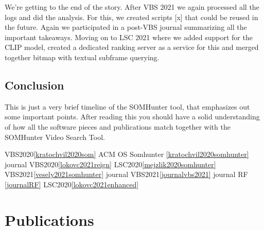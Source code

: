 We're getting to the end of the story. After VBS 2021 we again processed all the logs and did the analysis. For this, we created scripts [x] that could be reused in the future. Again we participated in a post-VBS journal summarizing all the important takeaways. Moving on to LSC 2021 where we added support for the CLIP model, created a dedicated ranking server as a service for this and merged together bitmap with textual subframe querying. 

\subsection{Conclusion}
This is just a very brief timeline of the SOMHunter tool, that emphasizes out some important points. After reading this you should have a solid understanding of how all the software pieces and publications match together with the SOMHunter Video Search Tool.


VBS2020\cref{kratochvil2020som}
ACM OS Somhunter \cref{kratochvil2020somhunter}
journal VBS2020\cref{lokovc2021reign}
LSC2020\cref{mejzlik2020somhunter}
VBS2021\cref{vesely2021somhunter}
journal VBS2021\cref{journalvbs2021}
journal RF \cref{journalRF}
LSC2020\cref{lokovc2021enhanced}


\section{Publications}

